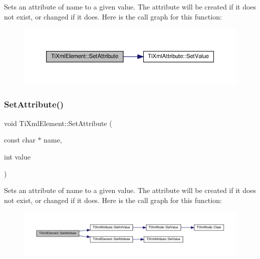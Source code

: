 Sets an attribute of name to a given value. The attribute will be created if it does not exist, or changed if it does. Here is the call graph for this function\+:
\nopagebreak
\begin{figure}[H]
\begin{center}
\leavevmode
\includegraphics[width=350pt]{classTiXmlElement_abf0b3bd7f0e4c746a89ec6e7f101fc32_cgraph}
\end{center}
\end{figure}
\mbox{\label{classTiXmlElement_ace6f4be75e373726d4774073d666d1a7}} 
\subsubsection{\texorpdfstring{Set\+Attribute()}{SetAttribute()}\hspace{0.1cm}{\footnotesize\ttfamily [2/2]}}
{\footnotesize\ttfamily void Ti\+Xml\+Element\+::\+Set\+Attribute (\begin{DoxyParamCaption}\item[{const char $\ast$}]{name,  }\item[{int}]{value }\end{DoxyParamCaption})}

Sets an attribute of name to a given value. The attribute will be created if it does not exist, or changed if it does. Here is the call graph for this function\+:
\nopagebreak
\begin{figure}[H]
\begin{center}
\leavevmode
\includegraphics[width=350pt]{classTiXmlElement_ace6f4be75e373726d4774073d666d1a7_cgraph}
\end{center}
\end{figure}
\mbox{\label{classTiXmlElement_a0d1dd975d75496778177e35abfe0ec0b}} 
